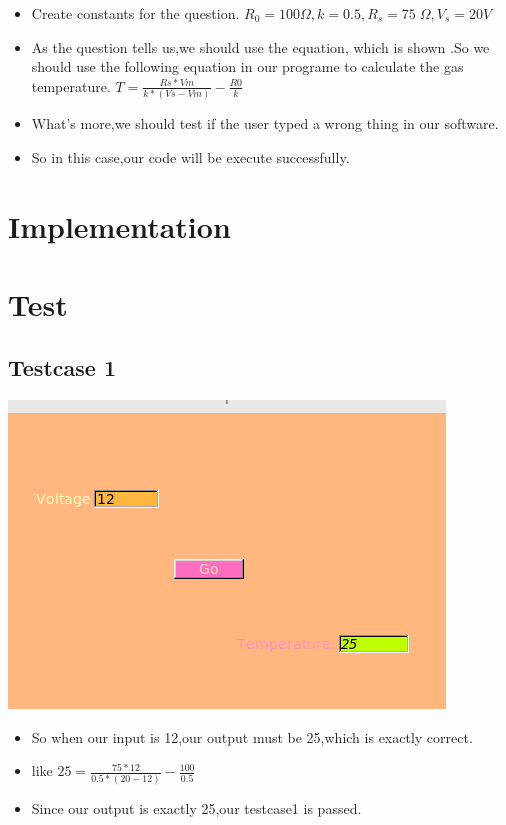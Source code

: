 \documentclass{article}
\begin{document}
\begin{itemize}
	\item Create constants for the question.
	$R_{0} = 100 \Omega, k = 0.5,R_{s} = 75 \; \Omega, V_{s} = 20 V $
	\item As the question tells us,we should use the equation, which is shown .So we should use the following equation in our programe to calculate the gas temperature.
	$T= \frac{Rs*Vm}{k*(Vs-Vm)}-\frac{R0}{k}$ 
	\item What's more,we should test if the user typed a wrong thing in our software.
	\item So in this case,our code will be execute successfully.
\end{itemize}
\newpage\section*{Implementation}



\newpage\section*{Test}
\subsection*{Testcase 1}
\includegraphics{testcase1.png}
\begin{itemize}
	\item So when our input is 12,our output must be 25,which is exactly correct.
	\item like $25= \frac{75*12}{0.5*(20-12)}-\frac{100}{0.5}$ 
	\item Since our output is exactly 25,our testcase1 is passed.
\end{itemize}
\end{document}
